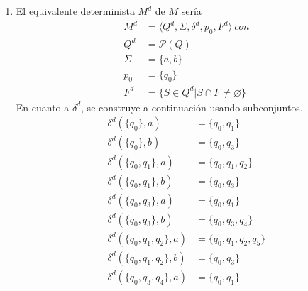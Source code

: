 \documentclass{article}
\begin{document}
\begin{enumerate}
{\begin{itemize}
\begin{enumerate}
{\begin{itemize}
{                                Luego 
                                \[\delta^{*}(\{q_{0}\}, abaab) \cap F = 
                                \{q_{0}, q_{3}\} \cap \{q_{5}\} = \varnothing\]
                                Por lo que $abaab$ no es aceptado por el 
                                autómata.
                            }
                        \end{itemize}
                    }
                    \item {
                        El equivalente determinista $M^{d}$ de $M$ sería 
                        \begin{align*}
                            M^{d} &= \langle Q^{d}, \Sigma, \delta^{d}, p_{0}, 
                            F^{d} \rangle \ con\\
                            Q^{d} &= \mathcal{P}(Q) \\
                            \Sigma &= \{a, b\} \\
                            p_{0} &= \{q_{0}\} \\
                            F^{d} &= \{S \in Q^{d} | S \cap F \neq \varnothing\}
                        \end{align*}
                        En cuanto a $\delta^{d}$, se construye a continuación 
                        usando subconjuntos.
                        \begin{align*}
                            \delta^{d}(\{q_{0}\}, a) &= \{q_{0}, q_{1}\} \\
                            \delta^{d}(\{q_{0}\}, b) &= \{q_{0}, q_{3}\} \\
                            \delta^{d}(\{q_{0}, q_{1}\}, a) &= \{q_{0}, q_{1}, q_{2}\}\\
                            \delta^{d}(\{q_{0}, q_{1}\}, b) &= \{q_{0}, q_{3}\}\\
                            \delta^{d}(\{q_{0}, q_{3}\}, a) &= \{q_{0}, q_{1}\}\\
                            \delta^{d}(\{q_{0}, q_{3}\}, b) &= \{q_{0}, q_{3}, q_{4}\}\\
                            \delta^{d}(\{q_{0}, q_{1}, q_{2}\}, a) &= \{q_{0}, q_{1}, q_{2}, q_{5}\}\\
                            \delta^{d}(\{q_{0}, q_{1}, q_{2}\}, b) &= \{q_{0}, q_{3}\}\\
                            \delta^{d}(\{q_{0}, q_{3}, q_{4}\}, a) &= \{q_{0}, q_{1}\}\\

\end{align*}}
\end{enumerate}
\end{itemize}}
\end{enumerate}
\end{document}
